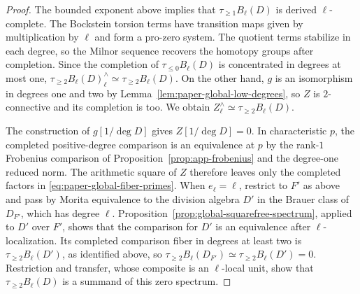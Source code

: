 \begin{proof}
The bounded exponent above implies that $\tau_{\ge1}B_\ell(D)$ is derived $\ell$-complete.
The Bockstein torsion terms have transition maps given by multiplication by $\ell$ and form a pro-zero system.
The quotient terms stabilize in each degree, so the Milnor sequence recovers the homotopy groups after completion.
Since the completion of $\tau_{\le0}B_\ell(D)$ is concentrated in degrees at most one, $\tau_{\ge2}B_\ell(D)^\wedge_\ell\simeq\tau_{\ge2}B_\ell(D)$.
On the other hand, $g$ is an isomorphism in degrees one and two by Lemma~\ref{lem:paper-global-low-degrees}, so $Z$ is $2$-connective and its completion is too.
We obtain $Z^\wedge_\ell\simeq\tau_{\ge2}B_\ell(D)$.

The construction of $g[1/\deg D]$ gives $Z[1/\deg D]=0$.
In characteristic $p$, the completed positive-degree comparison is an equivalence at $p$ by the rank-$1$ Frobenius comparison of Proposition~\ref{prop:app-frobenius} and the degree-one reduced norm.
The arithmetic square of $Z$ therefore leaves only the completed factors in \eqref{eq:paper-global-fiber-primes}.
When $e_\ell=\ell$, restrict to $F'$ as above and pass by Morita equivalence to the division algebra $D'$ in the Brauer class of $D_{F'}$, which has degree $\ell$.
Proposition~\ref{prop:global-squarefree-spectrum}, applied to $D'$ over $F'$, shows that the comparison for $D'$ is an equivalence after $\ell$-localization.
Its completed comparison fiber in degrees at least two is $\tau_{\ge2}B_\ell(D')$, as identified above, so $\tau_{\ge2}B_\ell(D_{F'})\simeq\tau_{\ge2}B_\ell(D')=0$.
Restriction and transfer, whose composite is an $\ell$-local unit, show that $\tau_{\ge2}B_\ell(D)$ is a summand of this zero spectrum.
\end{proof}

